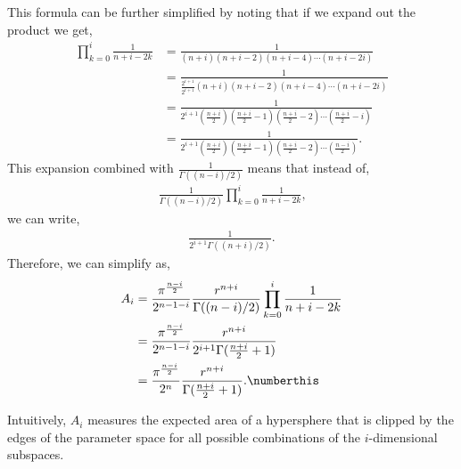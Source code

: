 This formula can be further simplified by noting that if we expand out 
the product we get,
\begin{align*}
  \prod_{k=0}^i \frac{1}{n+i-2k} 
    &= \frac{1}{(n+i)(n+i-2)(n+i-4)\cdots(n+i-2i)} \\
    &= \frac{1}{\frac{2^{i+1}}{2^{i+1}}
                (n+i)(n+i-2)(n+i-4)\cdots(n+i-2i)} \\
    &= \frac{1}{2^{i+1}
                \left(\frac{n+i}{2}\right)
                \left(\frac{n+i}{2} - 1\right)
                \left(\frac{n+i}{2} - 2\right)
                \cdots
                \left(\frac{n+i}{2} - i\right)} \\
    &= \frac{1}{2^{i+1}
                \left(\frac{n+i}{2}\right)
                \left(\frac{n+i}{2} - 1\right)
                \left(\frac{n+i}{2} - 2\right)
                \cdots
                \left(\frac{n-i}{2}\right)} \text{.}
\end{align*}
This expansion combined with $\frac{1}{\Gamma((n-i)/2)}$ means that instead
of,
\begin{align*}
  \frac{1}{\Gamma((n-i)/2)} \prod_{k=0}^i \frac{1}{n+i-2k}
  \text{,}
\end{align*}
we can write,
\begin{align*}
  \frac{1}{2^{i+1}\Gamma((n+i)/2)}
  \text{.}
\end{align*}
Therefore, we can simplify  as,
\begin{align*}
  A_i &= \frac{\pi^\frac{n-i}{2}}{2^{n-1-i}}\frac{r^{n+i}}{\Gamma((n-i)/2)} \prod_{k=0}^i \frac{1}{n+i-2k} \\
      &= \frac{\pi^\frac{n-i}{2}}{2^{n-1-i}}\frac{r^{n+i}}{2^{i+1}\Gamma(\frac{n+i}{2} + 1)} \\
      &= \frac{\pi^\frac{n-i}{2}}{2^{n}}\frac{r^{n+i}}{\Gamma(\frac{n+i}{2} + 1)}
           \text{.}
           \numberthis \label{eq:Ai}
\end{align*}

Intuitively, $A_i$ measures the expected area of a hypersphere that is clipped
by the edges of the parameter space for all possible combinations of the
$i$-dimensional subspaces.


